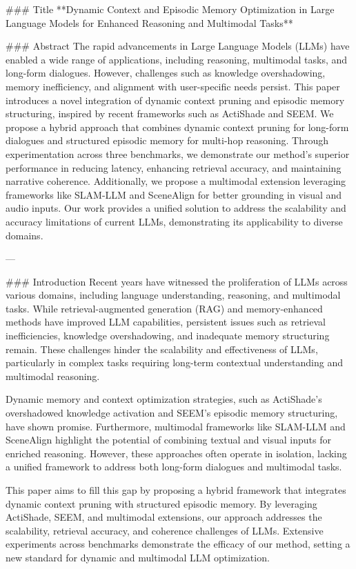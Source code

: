 ### Title
**Dynamic Context and Episodic Memory Optimization in Large Language Models for Enhanced Reasoning and Multimodal Tasks**

### Abstract
The rapid advancements in Large Language Models (LLMs) have enabled a wide range of applications, including reasoning, multimodal tasks, and long-form dialogues. However, challenges such as knowledge overshadowing, memory inefficiency, and alignment with user-specific needs persist. This paper introduces a novel integration of dynamic context pruning and episodic memory structuring, inspired by recent frameworks such as ActiShade and SEEM. We propose a hybrid approach that combines dynamic context pruning for long-form dialogues and structured episodic memory for multi-hop reasoning. Through experimentation across three benchmarks, we demonstrate our method's superior performance in reducing latency, enhancing retrieval accuracy, and maintaining narrative coherence. Additionally, we propose a multimodal extension leveraging frameworks like SLAM-LLM and SceneAlign for better grounding in visual and audio inputs. Our work provides a unified solution to address the scalability and accuracy limitations of current LLMs, demonstrating its applicability to diverse domains.

---

### Introduction
Recent years have witnessed the proliferation of LLMs across various domains, including language understanding, reasoning, and multimodal tasks. While retrieval-augmented generation (RAG) and memory-enhanced methods have improved LLM capabilities, persistent issues such as retrieval inefficiencies, knowledge overshadowing, and inadequate memory structuring remain. These challenges hinder the scalability and effectiveness of LLMs, particularly in complex tasks requiring long-term contextual understanding and multimodal reasoning.

Dynamic memory and context optimization strategies, such as ActiShade's overshadowed knowledge activation and SEEM's episodic memory structuring, have shown promise. Furthermore, multimodal frameworks like SLAM-LLM and SceneAlign highlight the potential of combining textual and visual inputs for enriched reasoning. However, these approaches often operate in isolation, lacking a unified framework to address both long-form dialogues and multimodal tasks.

This paper aims to fill this gap by proposing a hybrid framework that integrates dynamic context pruning with structured episodic memory. By leveraging ActiShade, SEEM, and multimodal extensions, our approach addresses the scalability, retrieval accuracy, and coherence challenges of LLMs. Extensive experiments across benchmarks demonstrate the efficacy of our method, setting a new standard for dynamic and multimodal LLM optimization.

